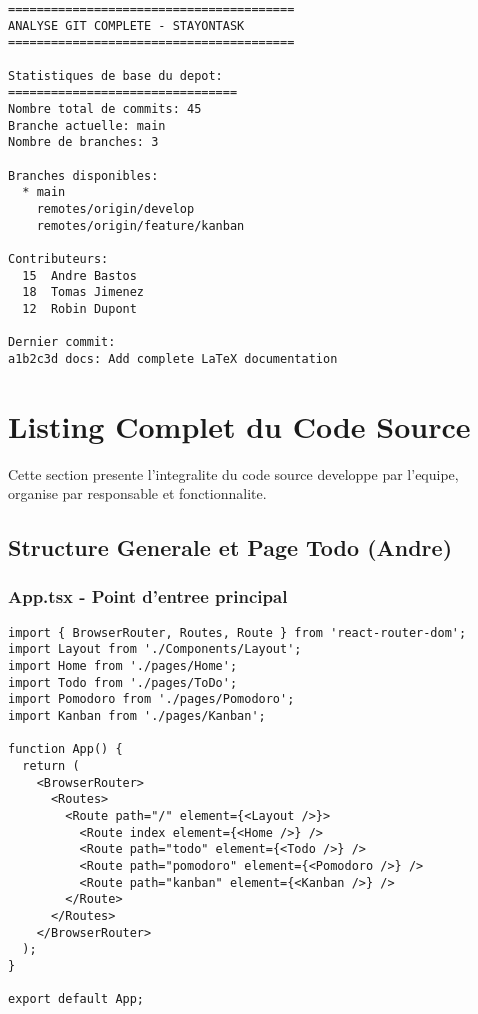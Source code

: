 \documentclass[12pt,a4paper]{article}
\begin{document}
\begin{verbatim}
========================================
ANALYSE GIT COMPLETE - STAYONTASK
========================================

Statistiques de base du depot:
================================
Nombre total de commits: 45
Branche actuelle: main
Nombre de branches: 3

Branches disponibles:
  * main
    remotes/origin/develop
    remotes/origin/feature/kanban

Contributeurs:
  15  Andre Bastos
  18  Tomas Jimenez  
  12  Robin Dupont

Dernier commit:
a1b2c3d docs: Add complete LaTeX documentation
\end{verbatim}

\section{Listing Complet du Code Source}

Cette section presente l'integralite du code source developpe par l'equipe, organise par responsable et fonctionnalite.

\subsection{Structure Generale et Page Todo (Andre)}

\subsubsection{App.tsx - Point d'entree principal}
\begin{lstlisting}[caption=App.tsx - Application principale (Andre)]
import { BrowserRouter, Routes, Route } from 'react-router-dom';
import Layout from './Components/Layout';
import Home from './pages/Home';
import Todo from './pages/ToDo';
import Pomodoro from './pages/Pomodoro';
import Kanban from './pages/Kanban';

function App() {
  return (
    <BrowserRouter>
      <Routes>
        <Route path="/" element={<Layout />}>
          <Route index element={<Home />} />
          <Route path="todo" element={<Todo />} />
          <Route path="pomodoro" element={<Pomodoro />} />
          <Route path="kanban" element={<Kanban />} />
        </Route>
      </Routes>
    </BrowserRouter>
  );
}

export default App;
\end{lstlisting}
\end{document}
